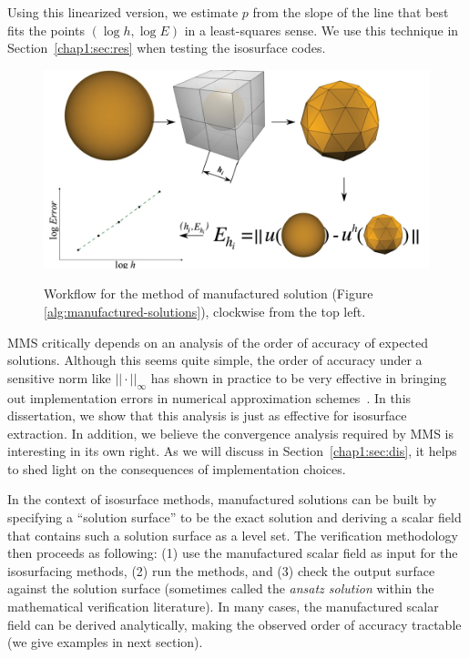 Using this linearized version, we estimate $p$ from the slope of 
the line that best fits the points $(\log h,\log E)$ in a
least-squares sense. We use this technique in Section~\ref{chap1:sec:res}
when testing the isosurface codes.

\begin{figure}[t]
\centering
\includegraphics[width=0.95\linewidth,keepaspectratio=true]{chapter2/figures/mms.pdf}
\label{fig:mms-flow}
\caption{Workflow for the method of manufactured solution (Figure \ref{alg:manufactured-solutions}), clockwise from the top left.}
\end{figure}

MMS critically depends on an analysis of the order of accuracy of
expected solutions. Although this seems quite simple, the order of
accuracy under a sensitive norm like $||\cdot||_\infty$ has shown in
practice to be very effective in bringing out implementation errors in
numerical approximation schemes~\cite{Roy2005,babuska04}. In this
dissertation, we show that this analysis is just as effective for isosurface
extraction. In addition, we believe the convergence analysis required
by MMS is interesting in its own right. As we will discuss in
Section~\ref{chap1:sec:dis}, it helps to shed light on the consequences of
implementation choices.

In the context of isosurface methods, manufactured solutions can be built by
specifying a ``solution surface'' to be the exact solution and deriving a 
scalar field that contains such a solution surface as a level set. The 
verification methodology then proceeds as following: 
(1) use the manufactured scalar field as input for the isosurfacing 
methods, (2) run the methods, and (3) check the output surface against 
the solution surface (sometimes called the {\em ansatz solution} within
the mathematical verification literature).
In many cases, the manufactured scalar field can be derived analytically, 
making the observed order of accuracy tractable (we give
examples in next section).

